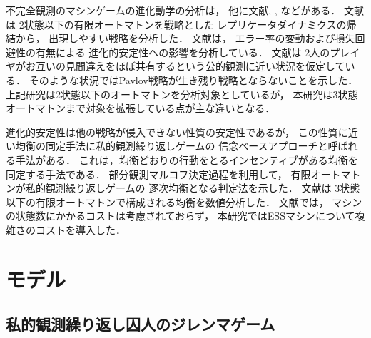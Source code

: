 \documentclass[submit]{ipsj}
\theoremstyle{definition}
\begin{document}
不完全観測のマシンゲームの進化動学の分析は，
他に文献\cite{nishino-2020}, \cite{yotsuji-2021}, \cite{igarashi-2021}などがある．
文献\cite{nishino-2020}は
2状態以下の有限オートマトンを戦略とした
レプリケータダイナミクスの帰結から，
出現しやすい戦略を分析した．
文献\cite{yotsuji-2021}は，
エラー率の変動および損失回避性の有無による
進化的安定性への影響を分析している．
文献\cite{igarashi-2021}は
2人のプレイヤがお互いの見間違えをほぼ共有するという公的観測に近い状況を仮定している．
そのような状況ではPavlov戦略が生き残り戦略とならないことを示した．
上記研究は2状態以下のオートマトンを分析対象としているが，
本研究は3状態オートマトンまで対象を拡張している点が主な違いとなる．

進化的安定性は他の戦略が侵入できない性質の安定性であるが，
この性質に近い均衡の同定手法に私的観測繰り返しゲームの
信念ベースアプローチと呼ばれる手法がある．
これは，均衡どおりの行動をとるインセンティブがある均衡を同定する手法である．
部分観測マルコフ決定過程を利用して，
有限オートマトンが私的観測繰り返しゲームの
逐次均衡となる判定法を示した．
文献\cite{joyonjun-2012}は
3状態以下の有限オートマトンで構成される均衡を数値分析した．
文献\cite{joyonjun-2012}では，
マシンの状態数にかかるコストは考慮されておらず，
本研究ではESSマシンについて複雑さのコストを導入した．


\section{モデル} \label{sec:model}

\subsection{私的観測繰り返し囚人のジレンマゲーム} \label{sec:model-game}
\end{document}
